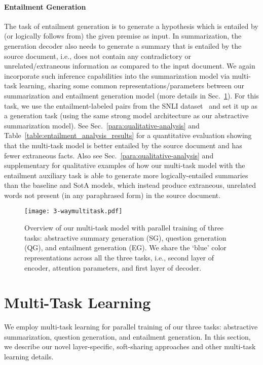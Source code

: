 \documentclass[11pt,a4paper]{article}
\begin{document}
\paragraph{Entailment Generation}
The task of entailment generation is to generate a hypothesis which is entailed by (or logically follows from) the given premise as input. 
In summarization, the generation decoder also needs to generate a summary that is entailed by the source document, i.e., does not contain any contradictory or unrelated/extraneous information as compared to the input document. We again incorporate such inference capabilities into the summarization model via multi-task learning, sharing some common representations/parameters between our summarization and entailment generation model (more details in Sec.~\ref{sec:multitask-learning}).
For this task, we use the entailment-labeled pairs from the SNLI dataset~\cite{bowman2015large} and set it up as a generation task (using the same strong model architecture as our abstractive summarization model). 
See Sec.~\ref{para:qualitative-analysis} and Table~\ref{table:entailment_analysis_results} for a quantitative evaluation showing that the multi-task model is better entailed by the source document and has fewer extraneous facts.
Also see Sec.~\ref{para:qualitative-analysis} and supplementary for qualitative examples of how our multi-task model with the entailment auxiliary task is able to generate more logically-entailed summaries than the baseline and SotA models, which instead produce extraneous, unrelated words not present (in any paraphrased form) in the source document.





 

\begin{figure}
\centering
\texttt{[image: 3-waymultitask.pdf]}
\vspace{-10pt}
\caption{Overview of our multi-task model with parallel training of three tasks: abstractive summary generation (SG), question generation (QG), and entailment generation (EG). We share the `blue' color representations across all the three tasks, i.e., second layer of encoder, attention parameters, and first layer of decoder.}
\vspace{-10pt}
\label{fig:mutlitask model}
\end{figure}
\section{Multi-Task Learning}
\label{sec:multitask-learning}
We employ multi-task learning for parallel training of our three tasks: abstractive summarization, question generation, and entailment generation. In this section, we describe our novel layer-specific, soft-sharing approaches and other multi-task learning details. 
\end{document}
